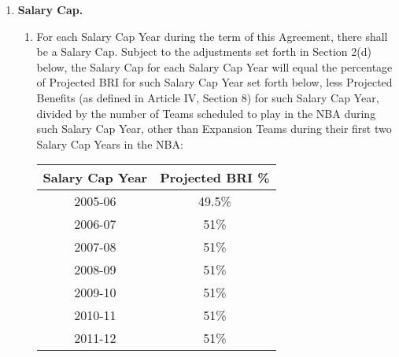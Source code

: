 \documentclass[
]{book}
\providecommand{\tightlist}{%
  \setlength{\itemsep}{0pt}\setlength{\parskip}{0pt}}
\begin{document}
\begin{enumerate}
\def\labelenumi{(\alph{enumi})}
\tightlist
\item
  \textbf{Salary Cap.}

  \begin{enumerate}
  \def\labelenumii{(\arabic{enumii})}
  \item
    For each Salary Cap Year during the term of this Agreement, there shall be a Salary Cap. Subject to the adjustments set forth in Section 2(d) below, the Salary Cap for each Salary Cap Year will equal the percentage of Projected BRI for such Salary Cap Year set forth below, less Projected Benefits (as defined in Article IV, Section 8) for such Salary Cap Year, divided by the number of Teams scheduled to play in the NBA during such Salary Cap Year, other than Expansion Teams during their first two Salary Cap Years in the NBA:

    \begin{longtable}[]{@{}cc@{}}
    \toprule()
    Salary Cap Year & Projected BRI \% \\
    \midrule()
    \endhead
    2005-06 & 49.5\% \\
    2006-07 & 51\% \\
    2007-08 & 51\% \\
    2008-09 & 51\% \\
    2009-10 & 51\% \\
    2010-11 & 51\% \\
    2011-12 & 51\% \\
    \bottomrule()
    \end{longtable}


\end{enumerate}
\end{enumerate}
\end{document}
